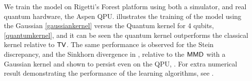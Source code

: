 We train the model on Rigetti's Forest platform\cite{smith_practical_2016} using both a simulator, and real quantum hardware, the {\selectfont Aspen} QPU.  illustrates the training of the model using the Gaussian \eqref{gaussiankernel} versus the Quantum kernel for 4 qubits, \eqref{quantumkernel}, and it can be seen the quantum kernel outperforms the classical kernel relative to $\operatorname{\textsf{TV}}$. The same performance is observed for the Stein discrepancy, and the Sinkhorn divergence in , relative to the $\operatorname{\textsf{MMD}}$ with a Gaussian kernel and shown to persist even on the QPU, .
For extra numerical result demonstrating the performance of the learning algorithms, see .

\begin{figure}[ht]
    \centering
    \begin{subfigure}[t]{0.47\textwidth}
\end{subfigure}
\end{figure}
